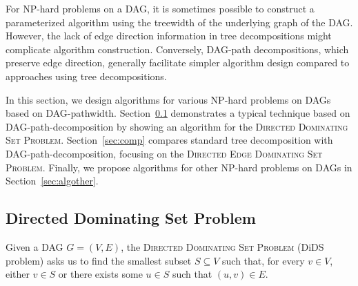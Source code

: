 \documentclass[runningheads]{llncs}
\theoremstyle{plain}
\theoremstyle{definition}
\begin{document}
For NP-hard problems on a DAG, it is sometimes possible to construct a parameterized algorithm using the treewidth of the underlying graph of the DAG.  
However, the lack of edge direction information in tree decompositions might complicate algorithm construction. Conversely, DAG-path decompositions, which preserve edge direction, generally facilitate simpler algorithm design compared to approaches using tree decompositions.

In this section, we design algorithms for various NP-hard problems on DAGs based on DAG-pathwidth.
Section~\ref{sec:DiDS} demonstrates a typical technique based on DAG-path-decomposition by showing an algorithm for the \textsc{Directed Dominating Set Problem}. Section~\ref{sec:comp} compares standard tree decomposition with DAG-path-decomposition, focusing on the \textsc{Directed Edge Dominating Set Problem}. Finally, we propose algorithms for other NP-hard problems on DAGs in Section~\ref{sec:algother}.

\subsection{Directed Dominating Set Problem}\label{sec:DiDS}

Given a DAG $G = (V, E)$, the \textsc{Directed Dominating Set Problem} (DiDS problem) asks us to
find the smallest subset \(S \subseteq V\) such that, for every \(v \in V\), either \(v \in S\) or there exists some \(u \in S\) such that \((u, v) \in E\).
\end{document}
